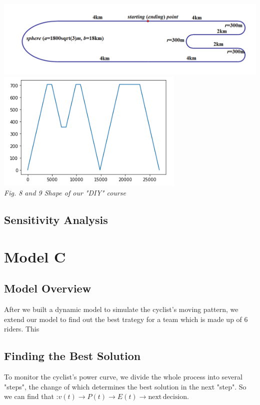 \documentclass[12pt]{article}
\theoremstyle{definition}
\theoremstyle{remark}
\numberwithin{equation}{section}
\begin{document}
	\begin{center}
		\includegraphics[width=15cm]{8.png}\\
		\includegraphics[width=9cm]{9.png}\\
		\small \textit{Fig. 8 and 9  Shape of our "DIY" course }
	\end{center}
	\subsection{Sensitivity Analysis}
	\section{Model C}
	\subsection{Model Overview}
	After we built a dynamic model to simulate the cyclist's moving pattern, we extend our model to find out the best trategy for a team which is made up of 6 riders. This
	\subsection{Finding the Best Solution}
	To monitor the cyclist's power curve, we divide the whole process into several "steps", the change of which determines the best solution in the next "step". So we can find that :$v(t)\rightarrow P(t)\rightarrow E(t)\rightarrow \mathrm{next\, decision}$.
\end{document}
